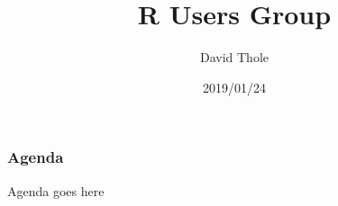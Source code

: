 \documentclass{beamer}
\title{R Users Group}
\author{David Thole}
\institute{University of Iowa, College of Pharmacy}
\date{2019/01/24}
\begin{document}
\frame{\titlepage}

\begin{frame}
    \frametitle{Agenda}
    Agenda goes here
\end{frame}
\end{document}
